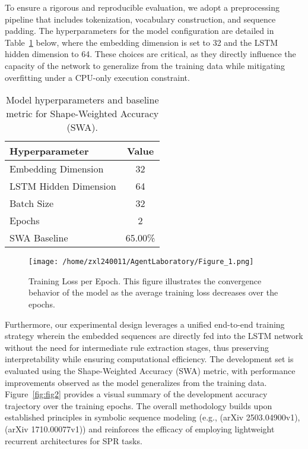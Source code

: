 \documentclass{article}
\begin{document}
To ensure a rigorous and reproducible evaluation, we adopt a preprocessing pipeline that includes tokenization, vocabulary construction, and sequence padding. The hyperparameters for the model configuration are detailed in Table~\ref{tab:hyperparams} below, where the embedding dimension is set to 32 and the LSTM hidden dimension to 64. These choices are critical, as they directly influence the capacity of the network to generalize from the training data while mitigating overfitting under a CPU-only execution constraint.

\begin{table}[h]
\centering
\begin{tabular}{|l|c|}
\hline
\textbf{Hyperparameter} & \textbf{Value} \\ \hline
Embedding Dimension    & 32             \\ \hline
LSTM Hidden Dimension  & 64             \\ \hline
Batch Size             & 32             \\ \hline
Epochs                 & 2              \\ \hline
SWA Baseline           & 65.00\%       \\ \hline
\end{tabular}
\caption{Model hyperparameters and baseline metric for Shape-Weighted Accuracy (SWA).}
\label{tab:hyperparams}
\end{table}

\begin{figure}[h]
\caption{Training Loss per Epoch. This figure illustrates the convergence behavior of the model as the average training loss decreases over the epochs.}
\centering
\texttt{[image: /home/zxl240011/AgentLaboratory/Figure\_1.png]}
\label{fig:fig1}
\end{figure}

Furthermore, our experimental design leverages a unified end-to-end training strategy wherein the embedded sequences are directly fed into the LSTM network without the need for intermediate rule extraction stages, thus preserving interpretability while ensuring computational efficiency. The development set is evaluated using the Shape-Weighted Accuracy (SWA) metric, with performance improvements observed as the model generalizes from the training data. Figure~\ref{fig:fig2} provides a visual summary of the development accuracy trajectory over the training epochs. The overall methodology builds upon established principles in symbolic sequence modeling (e.g., (arXiv 2503.04900v1), (arXiv 1710.00077v1)) and reinforces the efficacy of employing lightweight recurrent architectures for SPR tasks.
\end{document}
